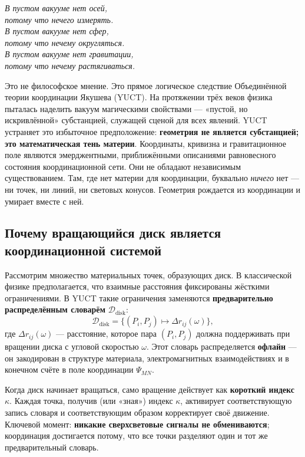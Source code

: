 \documentclass[12pt,a4paper]{article}
\begin{document}
	\begin{tcolorbox}[
		title={\bfseries Логически элементарное утверждение},
		colback=blue!3!white,
		colframe=blue!50!black,
		fonttitle=\bfseries,
		sharp corners
		]
		\small
		\textit{В пустом вакууме нет осей,\\
			потому что нечего измерять.\\
			В пустом вакууме нет сфер,\\
			потому что нечему округляться.\\
			В пустом вакууме нет гравитации,\\
			потому что нечему растягиваться.}
		
		\medskip
		Это не философское мнение. Это прямое логическое следствие Объединённой теории координации Якушева (YUCT). На протяжении трёх веков физика пыталась наделить вакуум магическими свойствами — «пустой, но искривлённой» субстанцией, служащей сценой для всех явлений. YUCT устраняет это избыточное предположение: \textbf{геометрия не является субстанцией; это математическая тень материи}. Координаты, кривизна и гравитационное поле являются эмерджентными, приближёнными описаниями равновесного состояния координационной сети. Они не обладают независимым существованием. Там, где нет материи для координации, буквально \textit{ничего} нет — ни точек, ни линий, ни световых конусов. Геометрия рождается из координации и умирает вместе с ней.
	\end{tcolorbox}
	
	\subsection{Почему вращающийся диск является координационной системой}
	\label{subsec:disk-coordination}
	
	Рассмотрим множество материальных точек, образующих диск. В классической физике предполагается, что взаимные расстояния фиксированы жёсткими ограничениями. В YUCT такие ограничения заменяются \textbf{предварительно распределённым словарём} \(\mathcal{D}_{\text{disk}}\):
	\[
	\mathcal{D}_{\text{disk}} = \bigl\{ (P_i, P_j) \mapsto \Delta r_{ij}(\omega) \bigr\},
	\]
	где \(\Delta r_{ij}(\omega)\) — расстояние, которое пара \((P_i,P_j)\) должна поддерживать при вращении диска с угловой скоростью \(\omega\). Этот словарь распределяется \textbf{офлайн} — он закодирован в структуре материала, электромагнитных взаимодействиях и в конечном счёте в поле координации \(\Psi_{MN}\).
	
	Когда диск начинает вращаться, само вращение действует как \textbf{короткий индекс} \(\kappa\). Каждая точка, получив (или «зная») индекс \(\kappa\), активирует соответствующую запись словаря и соответствующим образом корректирует своё движение. Ключевой момент: \textbf{никакие сверхсветовые сигналы не обмениваются}; координация достигается потому, что все точки разделяют один и тот же предварительный словарь.
	
\end{document}
